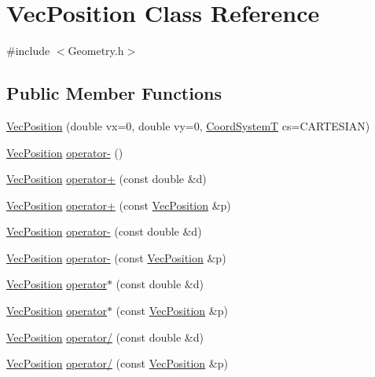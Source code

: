 \hypertarget{classVecPosition}{}\section{Vec\+Position Class Reference}
\label{classVecPosition}


{\ttfamily \#include $<$Geometry.\+h$>$}

\subsection*{Public Member Functions}
\begin{DoxyCompactItemize}
\item 
\hyperlink{classVecPosition_aaef39f83506e0dbdbba56ed703653536}{Vec\+Position} (double vx=0, double vy=0, \hyperlink{Geometry_8h_af3e194d00b468bcd9641c4d3576a0624}{Coord\+SystemT} cs=C\+A\+R\+T\+E\+S\+I\+AN)
\item 
\hyperlink{classVecPosition}{Vec\+Position} \hyperlink{classVecPosition_acf39e315c0fd4f8ebe8e321944a1a7b4}{operator-\/} ()
\item 
\hyperlink{classVecPosition}{Vec\+Position} \hyperlink{classVecPosition_ad505046cb789fac67ec75e3db92d803d}{operator+} (const double \&d)
\item 
\hyperlink{classVecPosition}{Vec\+Position} \hyperlink{classVecPosition_a7b46bb09b03dc26539e5827065cf16c7}{operator+} (const \hyperlink{classVecPosition}{Vec\+Position} \&p)
\item 
\hyperlink{classVecPosition}{Vec\+Position} \hyperlink{classVecPosition_a00750a347a154073191e9f3a79e9c934}{operator-\/} (const double \&d)
\item 
\hyperlink{classVecPosition}{Vec\+Position} \hyperlink{classVecPosition_a8fd387d4fa5ab30f0d427c49ab5602b2}{operator-\/} (const \hyperlink{classVecPosition}{Vec\+Position} \&p)
\item 
\hyperlink{classVecPosition}{Vec\+Position} \hyperlink{classVecPosition_a0c4cfcf8d97080b54210dc1bfbb8ab2f}{operator$\ast$} (const double \&d)
\item 
\hyperlink{classVecPosition}{Vec\+Position} \hyperlink{classVecPosition_a3e099efa940e8d24f5b8a503a99efd06}{operator$\ast$} (const \hyperlink{classVecPosition}{Vec\+Position} \&p)
\item 
\hyperlink{classVecPosition}{Vec\+Position} \hyperlink{classVecPosition_a62e5b243022e70bb4cce3f7a91d71cf5}{operator/} (const double \&d)
\item 
\hyperlink{classVecPosition}{Vec\+Position} \hyperlink{classVecPosition_a4be95888d92a2c9c147a954a599e7c08}{operator/} (const \hyperlink{classVecPosition}{Vec\+Position} \&p)

\end{DoxyCompactItemize}
